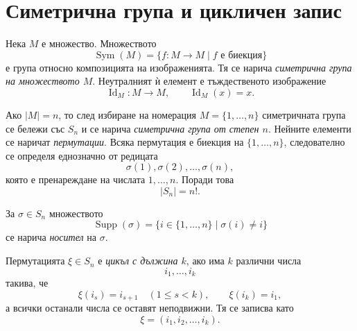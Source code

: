 \begin{konspekt}
\end{konspekt}

\section{Симетрична група и цикличен запис}\label{s:31.1}

\begin{defn}
Нека $M$ е множество. Множеството
\[
\operatorname{Sym}(M)=\{f\colon M\to M\mid f\text{ е биекция}\}
\]
е група относно композицията на изображенията. Тя се нарича \emph{симетрична група на множеството $M$}. Неутралният ѝ елемент е тъждественото изображение
\[
\operatorname{Id}_M\colon M\to M,\qquad \operatorname{Id}_M(x)=x.
\]
\end{defn}

Ако $|M|=n$, то след избиране на номерация $M=\{1,\ldots,n\}$ симетричната група се бележи със $S_n$ и се нарича \emph{симетрична група от степен $n$}. Нейните елементи се наричат \emph{пермутации}. Всяка пермутация е биекция на $\{1,\ldots,n\}$, следователно се определя еднозначно от редицата
\[
\sigma(1),\sigma(2),\ldots,\sigma(n),
\]
която е пренареждане на числата $1,\ldots,n$. Поради това
\[
|S_n|=n!.
\]

\begin{defn}
За $\sigma\in S_n$ множеството
\[
\operatorname{Supp}(\sigma)=\{i\in\{1,\ldots,n\}\mid \sigma(i)\ne i\}
\]
се нарича \emph{носител} на $\sigma$.
\end{defn}

\begin{defn}
Пермутацията $\xi\in S_n$ е \emph{цикъл с дължина $k$}, ако има $k$ различни числа
\[
i_1,\ldots,i_k
\]
такива, че
\[
\xi(i_s)=i_{s+1}\quad (1\le s<k),\qquad \xi(i_k)=i_1,
\]
а всички останали числа се оставят неподвижни. Тя се записва като
\[
\xi=(i_1,i_2,\ldots,i_k).
\]
\end{defn}

